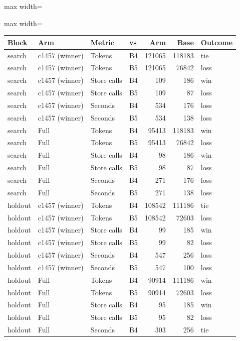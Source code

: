 \begin{table}[!t]
\centering\small
\begin{adjustbox}{max width=\linewidth}
\begin{adjustbox}{max width=\textwidth}
\begin{tabular}{@{}llllrrl@{}}
\toprule
Block & Arm & Metric & vs & Arm & Base & Outcome \\
\midrule
search & c1457 (winner) & Tokens & B4 & 121065 & 118183 & tie \\
search & c1457 (winner) & Tokens & B5 & 121065 & 76842 & loss \\
search & c1457 (winner) & Store calls & B4 & 109 & 186 & win \\
search & c1457 (winner) & Store calls & B5 & 109 & 87 & loss \\
search & c1457 (winner) & Seconds & B4 & 534 & 176 & loss \\
search & c1457 (winner) & Seconds & B5 & 534 & 138 & loss \\
search & Full & Tokens & B4 & 95413 & 118183 & win \\
search & Full & Tokens & B5 & 95413 & 76842 & loss \\
search & Full & Store calls & B4 & 98 & 186 & win \\
search & Full & Store calls & B5 & 98 & 87 & loss \\
search & Full & Seconds & B4 & 271 & 176 & loss \\
search & Full & Seconds & B5 & 271 & 138 & loss \\
holdout & c1457 (winner) & Tokens & B4 & 108542 & 111186 & tie \\
holdout & c1457 (winner) & Tokens & B5 & 108542 & 72603 & loss \\
holdout & c1457 (winner) & Store calls & B4 & 99 & 185 & win \\
holdout & c1457 (winner) & Store calls & B5 & 99 & 82 & loss \\
holdout & c1457 (winner) & Seconds & B4 & 547 & 256 & loss \\
holdout & c1457 (winner) & Seconds & B5 & 547 & 100 & loss \\
holdout & Full & Tokens & B4 & 90914 & 111186 & win \\
holdout & Full & Tokens & B5 & 90914 & 72603 & loss \\
holdout & Full & Store calls & B4 & 95 & 185 & win \\
holdout & Full & Store calls & B5 & 95 & 82 & loss \\
holdout & Full & Seconds & B4 & 303 & 256 & tie \\

\end{tabular}
\end{adjustbox}
\end{adjustbox}
\end{table}
